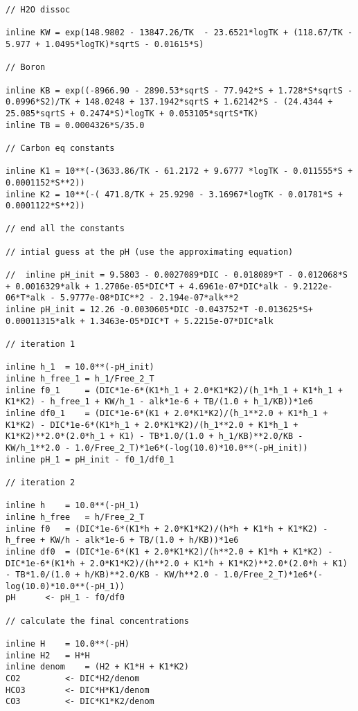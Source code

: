 \documentclass{ruthesis}
\begin{document}
\begin{verbatim}
// H2O dissoc

inline KW = exp(148.9802 - 13847.26/TK  - 23.6521*logTK + (118.67/TK - 5.977 + 1.0495*logTK)*sqrtS - 0.01615*S)

// Boron

inline KB = exp((-8966.90 - 2890.53*sqrtS - 77.942*S + 1.728*S*sqrtS - 0.0996*S2)/TK + 148.0248 + 137.1942*sqrtS + 1.62142*S - (24.4344 + 25.085*sqrtS + 0.2474*S)*logTK + 0.053105*sqrtS*TK)
inline TB = 0.0004326*S/35.0

// Carbon eq constants

inline K1 = 10**(-(3633.86/TK - 61.2172 + 9.6777 *logTK - 0.011555*S + 0.0001152*S**2))
inline K2 = 10**(-( 471.8/TK + 25.9290 - 3.16967*logTK - 0.01781*S + 0.0001122*S**2))

// end all the constants

// intial guess at the pH (use the approximating equation)

//	inline pH_init = 9.5803 - 0.0027089*DIC - 0.018089*T - 0.012068*S + 0.0016329*alk + 1.2706e-05*DIC*T + 4.6961e-07*DIC*alk - 9.2122e-06*T*alk - 5.9777e-08*DIC**2 - 2.194e-07*alk**2 
inline pH_init = 12.26 -0.0030605*DIC -0.043752*T -0.013625*S+ 0.00011315*alk + 1.3463e-05*DIC*T + 5.2215e-07*DIC*alk

// iteration 1

inline h_1 	= 10.0**(-pH_init)
inline h_free_1	= h_1/Free_2_T
inline f0_1 	= (DIC*1e-6*(K1*h_1 + 2.0*K1*K2)/(h_1*h_1 + K1*h_1 + K1*K2) - h_free_1 + KW/h_1 - alk*1e-6 + TB/(1.0 + h_1/KB))*1e6
inline df0_1 	= (DIC*1e-6*(K1 + 2.0*K1*K2)/(h_1**2.0 + K1*h_1 + K1*K2) - DIC*1e-6*(K1*h_1 + 2.0*K1*K2)/(h_1**2.0 + K1*h_1 + K1*K2)**2.0*(2.0*h_1 + K1) - TB*1.0/(1.0 + h_1/KB)**2.0/KB - KW/h_1**2.0 - 1.0/Free_2_T)*1e6*(-log(10.0)*10.0**(-pH_init))
inline pH_1	= pH_init - f0_1/df0_1

// iteration 2

inline h 	= 10.0**(-pH_1)
inline h_free 	= h/Free_2_T
inline f0 	= (DIC*1e-6*(K1*h + 2.0*K1*K2)/(h*h + K1*h + K1*K2) - h_free + KW/h - alk*1e-6 + TB/(1.0 + h/KB))*1e6
inline df0 	= (DIC*1e-6*(K1 + 2.0*K1*K2)/(h**2.0 + K1*h + K1*K2) - DIC*1e-6*(K1*h + 2.0*K1*K2)/(h**2.0 + K1*h + K1*K2)**2.0*(2.0*h + K1) - TB*1.0/(1.0 + h/KB)**2.0/KB - KW/h**2.0 - 1.0/Free_2_T)*1e6*(-log(10.0)*10.0**(-pH_1))
pH 		<- pH_1 - f0/df0    

// calculate the final concentrations

inline H 	= 10.0**(-pH)
inline H2 	= H*H
inline denom 	= (H2 + K1*H + K1*K2)
CO2  		<- DIC*H2/denom
HCO3 		<- DIC*H*K1/denom
CO3  		<- DIC*K1*K2/denom  


\end{verbatim}
\end{document}

